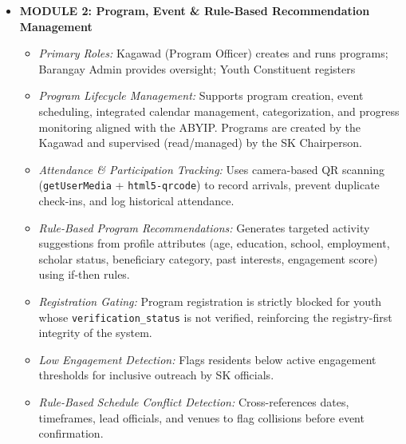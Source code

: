 \begin{itemize}
    \item \textbf{MODULE 2: Program, Event \& Rule-Based Recommendation Management}
    \begin{itemize}
        \item \textit{Primary Roles:} Kagawad (Program Officer) creates and runs programs; Barangay Admin provides oversight; Youth Constituent registers
        \item \textit{Program Lifecycle Management:} Supports program creation, event scheduling, integrated calendar management, categorization, and progress monitoring aligned with the ABYIP. Programs are created by the Kagawad and supervised (read/managed) by the SK Chairperson.
        \item \textit{Attendance \& Participation Tracking:} Uses camera-based QR scanning (\texttt{getUserMedia} + \texttt{html5-qrcode}) to record arrivals, prevent duplicate check-ins, and log historical attendance.
        \item \textit{Rule-Based Program Recommendations:} Generates targeted activity suggestions from profile attributes (age, education, school, employment, scholar status, beneficiary category, past interests, engagement score) using if-then rules.
        \item \textit{Registration Gating:} Program registration is strictly blocked for youth whose \texttt{verification\_status} is not verified, reinforcing the registry-first integrity of the system.
        \item \textit{Low Engagement Detection:} Flags residents below active engagement thresholds for inclusive outreach by SK officials.
        \item \textit{Rule-Based Schedule Conflict Detection:} Cross-references dates, timeframes, lead officials, and venues to flag collisions before event confirmation.
    \end{itemize}


\end{itemize}
